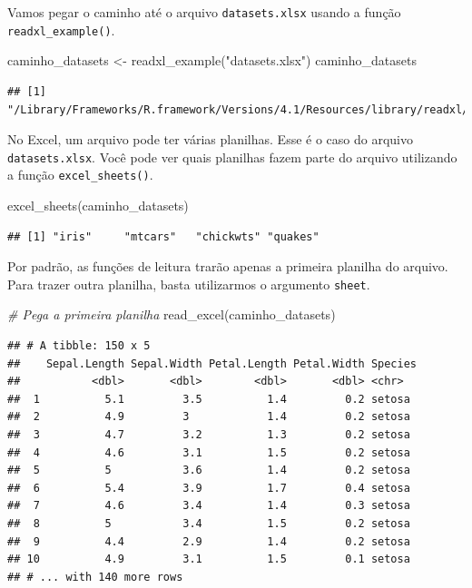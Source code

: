 \documentclass[
]{book}
\newenvironment{Shaded}{\begin{snugshade}}{\end{snugshade}}
\newcommand{\CommentTok}[1]{\textcolor[rgb]{0.56,0.35,0.01}{\textit{#1}}}
\newcommand{\FunctionTok}[1]{\textcolor[rgb]{0.00,0.00,0.00}{#1}}
\newcommand{\NormalTok}[1]{#1}
\newcommand{\OtherTok}[1]{\textcolor[rgb]{0.56,0.35,0.01}{#1}}
\newcommand{\StringTok}[1]{\textcolor[rgb]{0.31,0.60,0.02}{#1}}
\begin{document}
Vamos pegar o caminho até o arquivo \texttt{datasets.xlsx} usando a função \texttt{readxl\_example()}.

\begin{Shaded}
\begin{Highlighting}[]
\NormalTok{caminho\_datasets }\OtherTok{\textless{}{-}} \FunctionTok{readxl\_example}\NormalTok{(}\StringTok{"datasets.xlsx"}\NormalTok{)}
\NormalTok{caminho\_datasets}
\end{Highlighting}
\end{Shaded}

\begin{verbatim}
## [1] "/Library/Frameworks/R.framework/Versions/4.1/Resources/library/readxl/extdata/datasets.xlsx"
\end{verbatim}

No Excel, um arquivo pode ter várias planilhas. Esse é o caso do arquivo \texttt{datasets.xlsx}. Você pode ver quais planilhas fazem parte do arquivo utilizando a função \texttt{excel\_sheets()}.

\begin{Shaded}
\begin{Highlighting}[]
\FunctionTok{excel\_sheets}\NormalTok{(caminho\_datasets)}
\end{Highlighting}
\end{Shaded}

\begin{verbatim}
## [1] "iris"     "mtcars"   "chickwts" "quakes"
\end{verbatim}

Por padrão, as funções de leitura trarão apenas a primeira planilha do arquivo. Para trazer outra planilha, basta utilizarmos o argumento \texttt{sheet}.

\begin{Shaded}
\begin{Highlighting}[]
\CommentTok{\# Pega a primeira planilha}
\FunctionTok{read\_excel}\NormalTok{(caminho\_datasets)}
\end{Highlighting}
\end{Shaded}

\begin{verbatim}
## # A tibble: 150 x 5
##    Sepal.Length Sepal.Width Petal.Length Petal.Width Species
##           <dbl>       <dbl>        <dbl>       <dbl> <chr>  
##  1          5.1         3.5          1.4         0.2 setosa 
##  2          4.9         3            1.4         0.2 setosa 
##  3          4.7         3.2          1.3         0.2 setosa 
##  4          4.6         3.1          1.5         0.2 setosa 
##  5          5           3.6          1.4         0.2 setosa 
##  6          5.4         3.9          1.7         0.4 setosa 
##  7          4.6         3.4          1.4         0.3 setosa 
##  8          5           3.4          1.5         0.2 setosa 
##  9          4.4         2.9          1.4         0.2 setosa 
## 10          4.9         3.1          1.5         0.1 setosa 
## # ... with 140 more rows
\end{verbatim}
\end{document}
